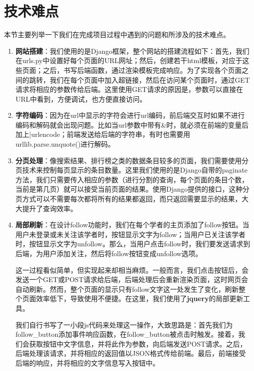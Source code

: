
\section{技术难点}

本节主要列举一下我们在完成项目过程中遇到的问题和所涉及的技术难点。

\begin{enumerate}
\item {\bf 网站搭建}：我们使用的是Django框架，整个网站的搭建流程如下：首先，我们在urls.py中设置好每个页面的URL网址；然后，创建若干html模板，对应于这些页面；之后，书写后端函数，通过渲染模板完成响应。为了实现各个页面之间的跳转，我们在每个页面中加入超链接，然后在访问某个页面时，通过GET请求将相应的参数传给后端。这里使用GET请求的原因是，参数可以直接在URL中看到，方便调试，也方便直接访问。

\item {\bf 字符编码}：因为在url中显示的字符会进行url编码，前后端交互时如果不进行编码和解码就会出现问题。比如当url参数中带有\&时，就必须在前端的变量后加上|urlencode；前端发送给后端的字符串，有时也需要用urllib.parse.unquote()进行解码。

\item {\bf 分页处理}：像搜索结果、排行榜之类的数据条目较多的页面，我们需要使用分页技术来控制每页显示的条目数量。这里我们使用的是Django自带的paginate方法，我们只需要传入相应的参数（进行分割的查询，每个页面的条目个数，当前是第几页）就可以接受当前页面的结果。使用Django提供的接口，这种分页方式可以不需要每次都将所有的结果都返回，而只返回需要显示的结果，大大提升了查询效率。

\item {\bf 局部刷新}：在设计follow功能时，我们在每个学者的主页添加了follow按钮。当用户未登录或未关注该学者时，按钮显示文字为follow；当用户已关注该学者时，按钮显示文字为unfollow。那么，当用户点击follow时，我们要发送请求到后端，为用户添加关注，然后将follow按钮变成unfollow选项。

这一过程看似简单，但实现起来却相当麻烦。一般而言，我们点击按钮后，会发送一个GET或POST请求给后端，后端处理后会重新渲染页面，这时网页会自动刷新。然而，整个页面的显示只有follow文字这一处发生了变化，刷新整个页面效率低下，导致使用不便捷。在这里，我们使用了{\bf jquery}的局部更新工具。

我们自行书写了一小段js代码来处理这一操作，大致思路是：首先我们为follow\_button添加事件响应函数，在follow\_button被点击时触发。接着，我们会获取按钮中文字信息，并将此作为参数，向后端发送POST请求。之后，后端处理该请求，并将相应的返回值以JSON格式传给前端。最后，前端接受后端的响应，并将相应的文字信息写入按钮中。


\end{enumerate}
